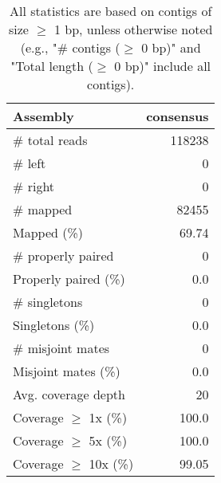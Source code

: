\documentclass[12pt,a4paper]{article}
\begin{document}
\begin{table}[ht]
\begin{center}
\caption{All statistics are based on contigs of size $\geq$ 1 bp, unless otherwise noted (e.g., "\# contigs ($\geq$ 0 bp)" and "Total length ($\geq$ 0 bp)" include all contigs).}
\begin{tabular}{|l*{1}{|r}|}
\hline
Assembly & consensus \\ \hline
\# total reads & 118238 \\ \hline
\# left & 0 \\ \hline
\# right & 0 \\ \hline
\# mapped & 82455 \\ \hline
Mapped (\%) & 69.74 \\ \hline
\# properly paired & 0 \\ \hline
Properly paired (\%) & 0.0 \\ \hline
\# singletons & 0 \\ \hline
Singletons (\%) & 0.0 \\ \hline
\# misjoint mates & 0 \\ \hline
Misjoint mates (\%) & 0.0 \\ \hline
Avg. coverage depth & 20 \\ \hline
Coverage $\geq$ 1x (\%) & 100.0 \\ \hline
Coverage $\geq$ 5x (\%) & 100.0 \\ \hline
Coverage $\geq$ 10x (\%) & 99.05 \\ \hline
\end{tabular}
\end{center}
\end{table}
\end{document}
